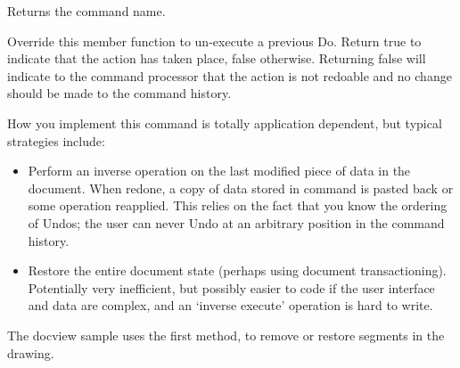 

Returns the command name.



Override this member function to un-execute a previous Do.
Return true to indicate that the action has taken place, false otherwise.
Returning false will indicate to the command processor that the action is
not redoable and no change should be made to the command history.

How you implement this command is totally application dependent, but typical
strategies include:

\begin{itemize}\itemsep=0pt
\item Perform an inverse operation on the last modified piece of
data in the document. When redone, a copy of data stored in command
is pasted back or some operation reapplied. This relies on the fact that
you know the ordering of Undos; the user can never Undo at an arbitrary position
in the command history.
\item Restore the entire document state (perhaps using document transactioning).
Potentially very inefficient, but possibly easier to code if the user interface
and data are complex, and an `inverse execute' operation is hard to write.
\end{itemize}

The docview sample uses the first method, to remove or restore segments
in the drawing.


